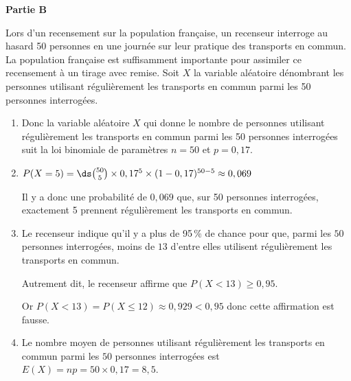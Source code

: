\bigskip

\textbf{Partie B}

\medskip

Lors d'un recensement sur la population française, un recenseur interroge au hasard 50 personnes en une journée sur leur pratique des transports en commun. 
La population française est suffisamment importante pour assimiler ce recensement à un tirage avec remise.
Soit $X$ la variable aléatoire dénombrant les personnes utilisant régulièrement les transports en commun parmi les 50 personnes interrogées.


\begin{enumerate}
\item %

Donc la variable aléatoire $X$ qui donne le nombre de personnes utilisant régulièrement les transports en commun parmi les 50 personnes interrogées suit la loi binomiale de paramètres $n=50$ et $p=0,17$.

\item $P(X = 5) = \ds\binom{50}{5}\times 0,17^5 \times (1-0,17)^{50-5}\approx 0,069$

Il y a donc une probabilité de $0,069$ que, sur 50 personnes interrogées, exactement 5 prennent régulièrement les transports en commun.

\item Le recenseur indique qu'il y a plus de 95\,\% de chance pour que, parmi les $50$ personnes interrogées, moins de $13$ d'entre elles utilisent régulièrement les transports en commun.

Autrement dit, le recenseur affirme que $P(X<13) \geqslant 0,95$.

Or $P(X<13)= P(X \leqslant 12) \approx  0,929 < 0,95$ donc cette affirmation est fausse.

\item Le nombre moyen de personnes utilisant régulièrement les transports en commun parmi les $50$ personnes interrogées est
$E(X)=np=50\times 0,17 = 8,5$.
\end{enumerate}

\bigskip


